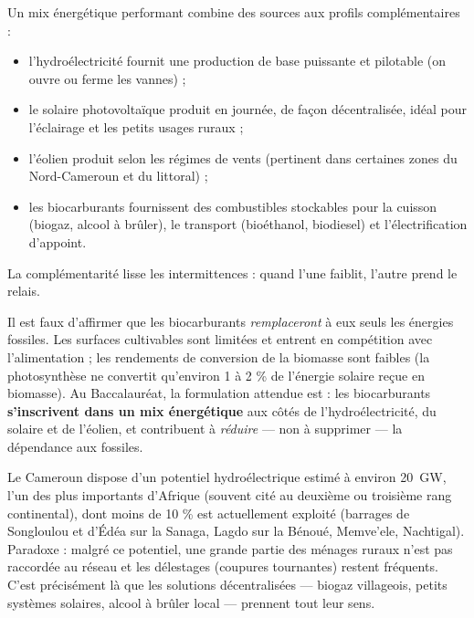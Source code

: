 \documentclass[11pt]{article}
\newcommand{\cle}[1]{{\popxbold\color{popdark}#1}}
\begin{document}
\begin{propriete}
Un \cle{mix énergétique} performant combine des sources aux profils complémentaires :
\begin{itemize}
\item l'\cle{hydroélectricité} fournit une production de base puissante et pilotable (on ouvre ou ferme les vannes) ;
\item le \cle{solaire photovoltaïque} produit en journée, de façon décentralisée, idéal pour l'éclairage et les petits usages ruraux ;
\item l'\cle{éolien} produit selon les régimes de vents (pertinent dans certaines zones du Nord-Cameroun et du littoral) ;
\item les \cle{biocarburants} fournissent des combustibles stockables pour la cuisson (biogaz, alcool à brûler), le transport (bioéthanol, biodiesel) et l'électrification d'appoint.
\end{itemize}
La complémentarité lisse les intermittences : quand l'une faiblit, l'autre prend le relais.
\end{propriete}

\begin{attention}
Il est faux d'affirmer que les biocarburants \emph{remplaceront} à eux seuls les énergies fossiles. Les surfaces cultivables sont limitées et entrent en compétition avec l'alimentation ; les rendements de conversion de la biomasse sont faibles (la photosynthèse ne convertit qu'environ 1 à 2 \% de l'énergie solaire reçue en biomasse). Au Baccalauréat, la formulation attendue est : les biocarburants \textbf{s'inscrivent dans un mix énergétique} aux côtés de l'hydroélectricité, du solaire et de l'éolien, et contribuent à \emph{réduire} — non à supprimer — la dépendance aux fossiles.
\end{attention}

\begin{savaistu}
Le Cameroun dispose d'un potentiel hydroélectrique estimé à environ \SI{20}{GW}, l'un des plus importants d'Afrique (souvent cité au deuxième ou troisième rang continental), dont moins de 10 \% est actuellement exploité (barrages de Songloulou et d'Édéa sur la Sanaga, Lagdo sur la Bénoué, Memve'ele, Nachtigal). Paradoxe : malgré ce potentiel, une grande partie des ménages ruraux n'est pas raccordée au réseau et les \cle{délestages} (coupures tournantes) restent fréquents. C'est précisément là que les solutions décentralisées — biogaz villageois, petits systèmes solaires, alcool à brûler local — prennent tout leur sens.
\end{savaistu}
\end{document}
